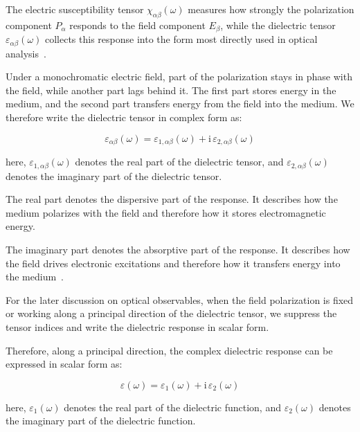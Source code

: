 The electric susceptibility tensor $\chi_{\alpha\beta}(\omega)$ measures how strongly the polarization component $P_\alpha$ responds to the field component $E_\beta$, while the dielectric tensor $\varepsilon_{\alpha\beta}(\omega)$ collects this response into the form most directly used in optical analysis~\cite{gajdovs2006linear}.

Under a monochromatic electric field, part of the polarization stays in phase with the field,
while another part lags behind it.
The first part stores energy in the medium, and the second part transfers energy from the field into the medium.
We therefore write the dielectric tensor in complex form as:

\begin{equation}
    \varepsilon_{\alpha\beta}(\omega)
    = \varepsilon_{1,\alpha\beta}(\omega)
    + \mathrm{i}\,\varepsilon_{2,\alpha\beta}(\omega)
\label{complex_dielectric_tensor_definition}
\end{equation}

here, $\varepsilon_{1,\alpha\beta}(\omega)$ denotes the real part of the dielectric tensor,
and $\varepsilon_{2,\alpha\beta}(\omega)$ denotes the imaginary part of the dielectric tensor.

The real part denotes the dispersive part of the response.
It describes how the medium polarizes with the field and therefore how it stores electromagnetic energy.

The imaginary part denotes the absorptive part of the response.
It describes how the field drives electronic excitations and therefore how it transfers energy into the medium~\cite{ambrosch2006linear}.

For the later discussion on optical observables,
when the field polarization is fixed or working along a principal direction of the dielectric tensor,
we suppress the tensor indices and write the dielectric response in scalar form.

Therefore, along a principal direction, the complex dielectric response can be expressed in scalar form as:

\begin{equation}
    \varepsilon(\omega)
    = \varepsilon_1(\omega)
    + \mathrm{i}\,\varepsilon_2(\omega)
\label{complex_dielectric_function_definition}
\end{equation}

here, $\varepsilon_1(\omega)$ denotes the real part of the dielectric function,
and $\varepsilon_2(\omega)$ denotes the imaginary part of the dielectric function.

